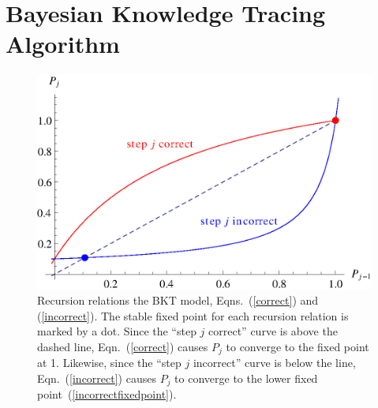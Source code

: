 \documentclass{acmlarge-edm}
\begin{document}
\section{Bayesian Knowledge Tracing Algorithm}

\begin{figure}
\centering\includegraphics{p-recursion.eps}
\caption{
  Recursion relations the BKT model, Eqns.~(\ref{correct}) and 
  (\ref{incorrect}).
  The stable fixed point for each recursion relation is marked
  by a dot.  Since the ``step $j$ correct'' curve is above the
  dashed line, Eqn.~(\ref{correct}) causes $P_j$ to 
   converge to the fixed point at 1.  Likewise, since 
   the ``step $j$ incorrect'' curve is below the line, 
   Eqn.~(\ref{incorrect}) causes $P_j$ to converge 
   to the lower fixed point~(\ref{incorrectfixedpoint}).
 }
 \label{p-recursion}
\end{figure}
\end{document}
